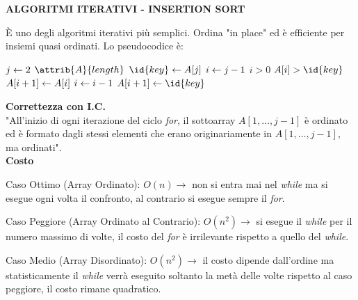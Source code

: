 \documentclass[8pt]{extarticle}
\begin{document}
\begin{formulario}
	\begin{tcenter}
\textbf{ALGORITMI ITERATIVI - INSERTION SORT}
	\end{tcenter}
È uno degli algoritmi iterativi più semplici. Ordina "in place" ed è efficiente per insiemi quasi ordinati. Lo pseudocodice è:
		\begin{codebox}
\li \For $j \leftarrow 2$ \To $\attrib{A}{length}$ \Do
	\li $\id{key} \la A[j]$
	\li $i \leftarrow j-1$
	\li \While $i > 0$  $A[i] > \id{key}$ \Do
		\li $A[i+1] \leftarrow A[i]$
		\li $i \leftarrow i-1$
	\End
	\li $A[i+1] \la \id{key}$
\End
		\end{codebox}
\textbf{Correttezza con I.C.} \\
"All'inizio di ogni iterazione del ciclo \textit{for}, il sottoarray $A[1,\dots,j-1]$ è ordinato ed è formato dagli stessi elementi che erano originariamente in $A[1,\dots,j-1]$, ma ordinati".\\
\textbf{Costo}
		\begin{descr}{1}
\item[Caso Ottimo] (Array Ordinato): $O(n)\rightarrow$ non si entra mai nel \textit{while} ma si esegue ogni volta il confronto, al contrario si esegue sempre il \textit{for}.
\item[Caso Peggiore] (Array Ordinato al Contrario): $O(n^2)\rightarrow$ si esegue il \textit{while} per il numero massimo di volte, il costo del \textit{for} è irrilevante rispetto a quello del \textit{while}.
\item[Caso Medio] (Array Disordinato): $O(n^2)\rightarrow$ il costo dipende dall'ordine ma statisticamente il \textit{while} verrà eseguito soltanto la metà delle volte rispetto al caso peggiore, il costo rimane quadratico. 
		\end{descr}
\myRule


\end{formulario}
\end{document}
